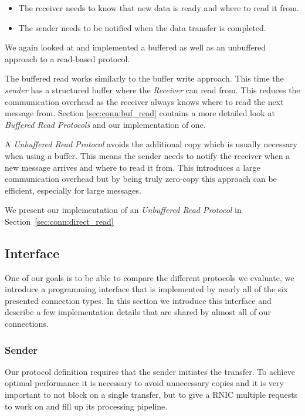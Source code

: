 \begin{itemize}
  \item The receiver needs to know that new data is ready and where to read it from.
  \item The sender needs to be notified when the data transfer is completed.
\end{itemize}

We again looked at and implemented a buffered as well as an unbuffered approach to a read-based protocol. 


The buffered read works similarly to the buffer write approach. This time the \emph{sender} has a structured buffer where the 
\emph{Receiver} can read from. This reduces the communication overhead as the receiver always knows where to read the next 
message from. Section \ref{sec:conn:buf_read} contains a more detailed look at \emph{Buffered Read Protocols} and our 
implementation of one.

A \emph{Unbuffered Read Protocol} avoids the additional copy which is usually necessary when using a buffer. This means the 
sender needs to notify the receiver when a new message arrives and where to read it from.  This introduces a large
communication overhead but by being truly zero-copy this approach can be efficient, especially for large messages.

We present our implementation of an \emph{Unbuffered Read Protocol} in Section~\ref{sec:conn:direct_read}


\pagebreak
\subsection{Interface}

One of our goals is to be able to compare the different protocols we evaluate, we introduce a programming 
interface that is implemented by nearly all of the six presented connection types. In this section we introduce this interface
and describe a few implementation details that are shared by almost all of our connections.

\subsubsection{Sender}

Our protocol definition requires that the sender initiates the transfer. To achieve optimal performance it is
necessary to avoid unnecessary copies and it is very important to not block on a single transfer, but to give a RNIC multiple
requests to work on and fill up its processing pipeline. 

